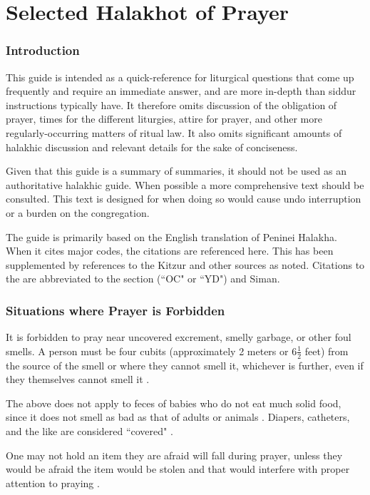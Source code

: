 \part{Selected Halakhot of Prayer}
\section{Introduction}

This guide is intended as a quick-reference for liturgical questions that come up frequently and require an immediate answer, and are more in-depth than siddur instructions typically have. It therefore omits discussion of the obligation of prayer, times for the different liturgies, attire for prayer, and other more regularly-occurring matters of ritual law. It also omits significant amounts of halakhic discussion and relevant details for the sake of conciseness.

Given that this guide is a summary of summaries, it should not be used as an authoritative halakhic guide. When possible a more comprehensive text should be consulted.  This text is designed for when doing so would cause undo interruption or a burden on the congregation.

The guide is primarily based on the English translation of Peninei Halakha.  When it cites major codes, the citations are referenced here. This has been supplemented by references to the Kitzur \SA\space and other sources as noted. Citations to the \SA\space are abbreviated to the section  (``OC" or ``YD") and Siman.

\section{Situations where Prayer is Forbidden}

It is forbidden to pray near uncovered excrement, smelly garbage, or other foul smells.  A person must be four cubits (approximately 2 meters or 6$\frac{1}{2}$ feet) from the source of the smell or where they cannot smell it, whichever is further, even if they themselves cannot smell it \parencite*[3:9 citing OC 79]{PH}.%

The above does not apply to feces of babies who do not eat much solid food, since it does not smell as bad as that of adults or animals \parencite*[4:3 citing OC 81]{PH}. Diapers, catheters, and the like are considered ``covered" \parencite*[4:4]{PH}.

One may not hold an item they are afraid will fall during prayer, unless they would be afraid the item would be stolen and that would interfere with proper attention to praying \parencite[5:7 citing OC 96]{PH}.

